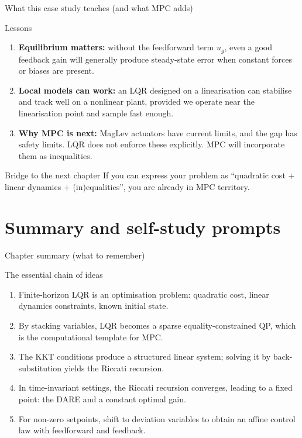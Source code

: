 \documentclass[aspectratio=169,11pt]{beamer}
\begin{document}
\begin{frame}{What this case study teaches (and what MPC adds)}
\begin{block}{Lessons}
\begin{enumerate}
  \item \textbf{Equilibrium matters:} without the feedforward term $u_g$, even a good feedback gain will generally produce steady-state error when constant forces or biases are present.
  \item \textbf{Local models can work:} an LQR designed on a linearisation can stabilise and track well on a nonlinear plant, provided we operate near the linearisation point and sample fast enough.
  \item \textbf{Why MPC is next:} MagLev actuators have current limits, and the gap has safety limits. LQR does not enforce these explicitly. MPC will incorporate them as inequalities.
\end{enumerate}
\end{block}

\begin{alertblock}{Bridge to the next chapter}
If you can express your problem as ``quadratic cost + linear dynamics + (in)equalities'', you are already in MPC territory.
\end{alertblock}
\end{frame}

\section{Summary and self-study prompts}

\begin{frame}{Chapter summary (what to remember)}
\begin{block}{The essential chain of ideas}
\begin{enumerate}
  \item Finite-horizon LQR is an optimisation problem: quadratic cost, linear dynamics constraints, known initial state.
  \item By stacking variables, LQR becomes a sparse equality-constrained QP, which is the computational template for MPC.
  \item The KKT conditions produce a structured linear system; solving it by back-substitution yields the Riccati recursion.
  \item In time-invariant settings, the Riccati recursion converges, leading to a fixed point: the DARE and a constant optimal gain.
  \item For non-zero setpoints, shift to deviation variables to obtain an affine control law with feedforward and feedback.
\end{enumerate}
\end{block}
\end{frame}
\end{document}
